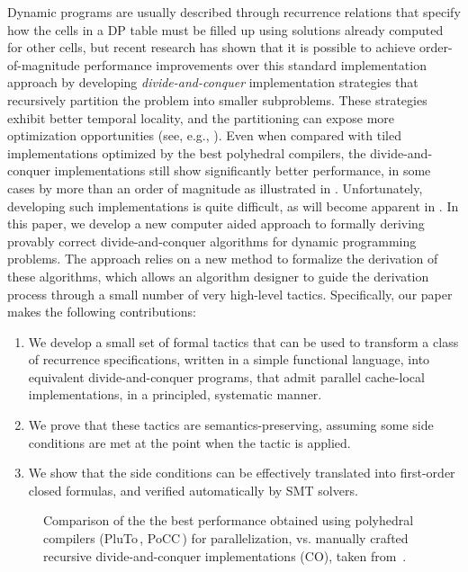 Dynamic programs are usually described through recurrence relations
that specify how the cells in a DP table must be filled up
using solutions already computed for other cells, but recent research has shown that it is possible
to achieve order-of-magnitude performance improvements over this
standard implementation approach by developing \emph{divide-and-conquer}
 implementation strategies that recursively
partition the problem into smaller subproblems.  These strategies
exhibit better temporal locality, and the partitioning can expose more
optimization opportunities (see, e.g., \cite{IPDPS15/Tithi}). 
Even when compared with tiled implementations optimized by the best polyhedral compilers, 
the divide-and-conquer implementations still show significantly better performance, in some cases
by more than an order of magnitude as illustrated in . 
Unfortunately, developing such implementations is quite difficult, as will become apparent in .
In this paper, we develop a new computer aided approach to formally deriving provably correct divide-and-conquer algorithms
for dynamic programming problems. The approach relies on a new method to formalize the derivation of these algorithms, which
allows an algorithm designer to guide the derivation process through a small number of very high-level tactics. 
Specifically, our paper makes the following contributions:
\begin{enumerate}
  \item We develop a small set of formal tactics that can be used to transform a class of recurrence
  specifications, written in a simple functional language, 
  into equivalent divide-and-conquer programs, that admit parallel cache-local
  implementations, in a principled, systematic manner.
  \item We prove that these tactics are semantics-preserving, assuming some side conditions are met
  at the point when the tactic is applied.
  \item We show that the side conditions can be effectively translated into first-order closed
  formulas, and verified automatically by SMT solvers.
\end{enumerate}



\begin{figure}
\resizebox{\textwidth}{!}{}
\caption{\label{intro:performance}
  Comparison of the the best performance obtained using polyhedral compilers 
  (PluTo\,\cite{HPC10/Pouchet}, PoCC\,\cite{PLDI08/Bondhugula})
  for parallelization, vs. manually crafted recursive divide-and-conquer implementations (CO),
  taken from~\cite{IPDPS15/Tithi}.}
\end{figure}

